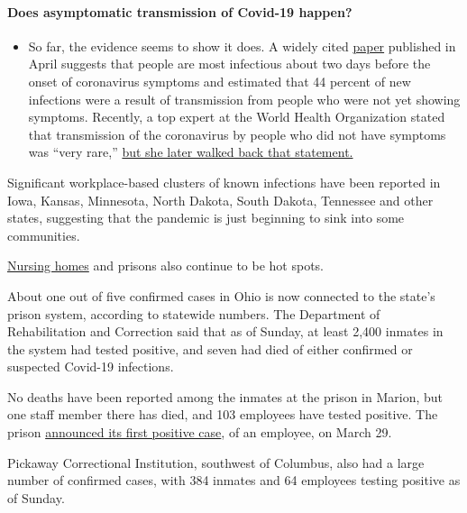 \begin{itemize}
{  \paragraph{Does asymptomatic transmission of Covid-19
  happen?}\label{does-asymptomatic-transmission-of-covid-19-happen}}

  \begin{itemize}
  \tightlist
  \item
    So far, the evidence seems to show it does. A widely cited
    \href{https://www.nature.com/articles/s41591-020-0869-5}{paper}
    published in April suggests that people are most infectious about
    two days before the onset of coronavirus symptoms and estimated that
    44 percent of new infections were a result of transmission from
    people who were not yet showing symptoms. Recently, a top expert at
    the World Health Organization stated that transmission of the
    coronavirus by people who did not have symptoms was ``very rare,''
    \href{https://www.nytimes.com/2020/06/09/world/coronavirus-updates.html?action=click\&pgtype=Article\&state=default\&region=MAIN_CONTENT_3\&context=storylines_faq\#link-1f302e21}{but
    she later walked back that statement.}
  \end{itemize}
\end{itemize}

Significant workplace-based clusters of known infections have been
reported in Iowa, Kansas, Minnesota, North Dakota, South Dakota,
Tennessee and other states, suggesting that the pandemic is just
beginning to sink into some communities.

\href{https://www.nytimes.com/2020/04/19/nyregion/coronavirus-nj-andover-nursing-home-deaths.html}{Nursing
homes} and prisons also continue to be hot spots.

About one out of five confirmed cases in Ohio is now connected to the
state's prison system, according to statewide numbers. The Department of
Rehabilitation and Correction said that as of Sunday, at least 2,400
inmates in the system had tested positive, and seven had died of either
confirmed or suspected Covid-19 infections.

No deaths have been reported among the inmates at the prison in Marion,
but one staff member there has died, and 103 employees have tested
positive. The prison
\href{https://www.drc.ohio.gov/Family/COVID-19-UPDATES}{announced its
first positive case}, of an employee, on March 29.

Pickaway Correctional Institution, southwest of Columbus, also had a
large number of confirmed cases, with 384 inmates and 64 employees
testing positive as of Sunday.

